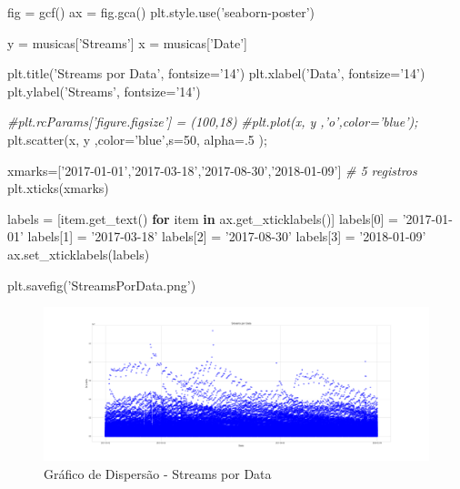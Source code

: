 \documentclass[11pt]{article}
\makeatletter
\def\maxwidth{\ifdim\Gin@nat@width>\linewidth\linewidth
    \else\Gin@nat@width\fi}
\let\Oldincludegraphics\includegraphics
\renewcommand{\includegraphics}[1]{\Oldincludegraphics[width=.8\maxwidth]{#1}}
\newenvironment{Shaded}{}{}
\newcommand{\KeywordTok}[1]{\textcolor[rgb]{0.00,0.44,0.13}{\textbf{{#1}}}}
\newcommand{\DecValTok}[1]{\textcolor[rgb]{0.25,0.63,0.44}{{#1}}}
\newcommand{\StringTok}[1]{\textcolor[rgb]{0.25,0.44,0.63}{{#1}}}
\newcommand{\CommentTok}[1]{\textcolor[rgb]{0.38,0.63,0.69}{\textit{{#1}}}}
\newcommand{\NormalTok}[1]{{#1}}
\newcommand{\ControlFlowTok}[1]{\textcolor[rgb]{0.00,0.44,0.13}{\textbf{{#1}}}}
\newcommand{\OperatorTok}[1]{\textcolor[rgb]{0.40,0.40,0.40}{{#1}}}
\makeatother
\begin{document}
\begin{Shaded}
\begin{Highlighting}[]
\NormalTok{fig }\OperatorTok{=}\NormalTok{ gcf()}
\NormalTok{ax }\OperatorTok{=}\NormalTok{ fig.gca()}
\NormalTok{plt.style.use(}\StringTok{'seaborn-poster'}\NormalTok{)}

\NormalTok{y }\OperatorTok{=}\NormalTok{ musicas[}\StringTok{'Streams'}\NormalTok{]}
\NormalTok{x }\OperatorTok{=}\NormalTok{ musicas[}\StringTok{'Date'}\NormalTok{] }

\NormalTok{plt.title(}\StringTok{'Streams por Data'}\NormalTok{, fontsize}\OperatorTok{=}\StringTok{'14'}\NormalTok{)}
\NormalTok{plt.xlabel(}\StringTok{'Data'}\NormalTok{, fontsize}\OperatorTok{=}\StringTok{'14'}\NormalTok{)}
\NormalTok{plt.ylabel(}\StringTok{'Streams'}\NormalTok{, fontsize}\OperatorTok{=}\StringTok{'14'}\NormalTok{)}


\CommentTok{#plt.rcParams['figure.figsize'] = (100,18)}
\CommentTok{#plt.plot(x, y ,'o',color='blue');}
\NormalTok{plt.scatter(x, y ,color}\OperatorTok{=}\StringTok{'blue'}\NormalTok{,s}\OperatorTok{=}\DecValTok{50}\NormalTok{, alpha}\OperatorTok{=}\NormalTok{.}\DecValTok{5}\NormalTok{ )}\OperatorTok{;}

\NormalTok{xmarks}\OperatorTok{=}\NormalTok{[}\StringTok{'2017-01-01'}\NormalTok{,}\StringTok{'2017-03-18'}\NormalTok{,}\StringTok{'2017-08-30'}\NormalTok{,}\StringTok{'2018-01-09'}\NormalTok{] }\CommentTok{# 5 registros}
\NormalTok{plt.xticks(xmarks)}

\NormalTok{labels }\OperatorTok{=}\NormalTok{ [item.get_text() }\ControlFlowTok{for}\NormalTok{ item }\KeywordTok{in}\NormalTok{ ax.get_xticklabels()]}
\NormalTok{labels[}\DecValTok{0}\NormalTok{] }\OperatorTok{=} \StringTok{'2017-01-01'}
\NormalTok{labels[}\DecValTok{1}\NormalTok{] }\OperatorTok{=} \StringTok{'2017-03-18'}
\NormalTok{labels[}\DecValTok{2}\NormalTok{] }\OperatorTok{=} \StringTok{'2017-08-30'}
\NormalTok{labels[}\DecValTok{3}\NormalTok{] }\OperatorTok{=} \StringTok{'2018-01-09'}
\NormalTok{ax.set_xticklabels(labels)}

\NormalTok{plt.savefig(}\StringTok{'StreamsPorData.png'}\NormalTok{) }
\end{Highlighting}
\end{Shaded}

\begin{figure}
\centering
\includegraphics{StreamsPorData.png}
\caption{Gráfico de Dispersão - Streams por Data}
\end{figure}
\end{document}
